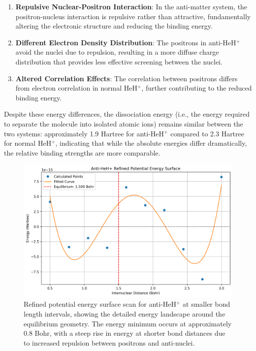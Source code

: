 \documentclass[10pt,twocolumn,a4paper]{article}
\begin{document}
\begin{enumerate}
    \item \textbf{Repulsive Nuclear-Positron Interaction}: In the anti-matter system, the positron-nucleus interaction is repulsive rather than attractive, fundamentally altering the electronic structure and reducing the binding energy.
    
    \item \textbf{Different Electron Density Distribution}: The positrons in anti-HeH$^+$ avoid the nuclei due to repulsion, resulting in a more diffuse charge distribution that provides less effective screening between the nuclei.
    
    \item \textbf{Altered Correlation Effects}: The correlation between positrons differs from electron correlation in normal HeH$^+$, further contributing to the reduced binding energy.
\end{enumerate}

Despite these energy differences, the dissociation energy (i.e., the energy required to separate the molecule into isolated atomic ions) remains similar between the two systems: approximately 1.9 Hartree for anti-HeH$^+$ compared to 2.3 Hartree for normal HeH$^+$, indicating that while the absolute energies differ dramatically, the relative binding strengths are more comparable.

\begin{figure}[t!]
    \centering
    \includegraphics[width=\columnwidth]{graphs/anti_heh_refined_pes.png}
    \caption{Refined potential energy surface scan for anti-HeH$^+$ at smaller bond length intervals, showing the detailed energy landscape around the equilibrium geometry. The energy minimum occurs at approximately 0.8 Bohr, with a steep rise in energy at shorter bond distances due to increased repulsion between positrons and anti-nuclei.}
    \label{fig:refined_pes}
\end{figure}
\end{document}
